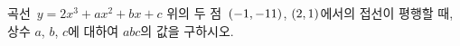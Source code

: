곡선~$y=2x^3+ax^2+bx+c$ 위의 두 점~$(-1{,}\mkern3mu\mathopen{}-11)$, $(2{,}\mkern3mu\mathopen{}1)$에서의 접선이 평행할 때, 상수 $a$, $b$, $c$에 대하여 $abc$의 값을 구하시오.
